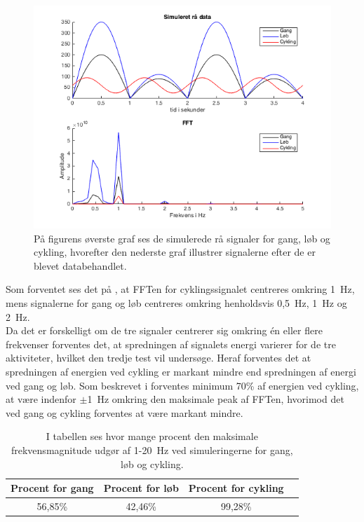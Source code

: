 \begin{figure}[H]
	\centering
	\includegraphics[width=.9\textwidth]{figures/cDesign/sim_gyro.png}
	\caption{På figurens øverste graf ses de simulerede rå signaler for gang, løb og cykling, hvorefter den nederste graf illustrer signalerne efter de er blevet databehandlet.}
	\label{fig:sim_gyro}
\end{figure}

Som forventet ses det på , at FFTen for cyklingssignalet centreres omkring 1~Hz, mens signalerne for gang og løb centreres omkring henholdsvis 0,5~Hz, 1~Hz og 2~Hz.\\ 
Da det er forskelligt om de tre signaler centrerer sig omkring én eller flere frekvenser forventes det, at spredningen af signalets energi varierer for de tre aktiviteter, hvilket den tredje test vil undersøge. Heraf forventes det at spredningen af energien ved cykling er markant mindre end spredningen af energi ved gang og løb. Som beskrevet i  forventes minimum 70\% af energien ved cykling, at være indenfor $\pm$1~Hz omkring den maksimale peak af FFTen, hvorimod det ved gang og cykling forventes at være markant mindre. 

\begin{table}[H]
	\centering
	\begin{tabular}{cccc}
		\hline
		\rowcolor[HTML]{C0C0C0} 
		Procent for gang & Procent for løb & Procent for cykling \\ \hline
		56,85\% & 42,46\% & 99,28\% \\ \hline	
	\end{tabular}
	\caption{I tabellen ses hvor mange procent den maksimale frekvensmagnitude udgør af 1-20~Hz ved simuleringerne for gang, løb og cykling.}
	\label{tab:sim_procent}
\end{table}\vspace{-0.5cm}

